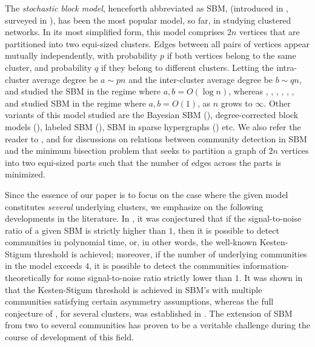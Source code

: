 \documentclass[11pt,reqno]{amsart}
\theoremstyle{definition}
\theoremstyle{remark}
\theoremstyle{conjecture}
\begin{document}
The \emph{stochastic block model}, henceforth abbreviated as SBM, (introduced in \cite{holland}, surveyed in \cite{survey}), has been the most popular model, so far, in studying clustered networks. In its most simplified form, this model comprises $2n$ vertices that are partitioned into two equi-sized clusters. Edges between all pairs of vertices appear mutually independently, with probability $p$ if both vertices belong to the same cluster, and probability $q$ if they belong to different clusters. Letting the intra-cluster average degree be $a \sim p n$ and the inter-cluster average degree be $b \sim q n$, \cite{mcsherry} and \cite{exact} studied the SBM in the regime where $a, b = O(\log n)$, whereas \cite{coja}, \cite{decelle_1}, \cite{decelle_2}, \cite{mossel_1}, \cite{mossel_2}, \cite{mossel_3}, \cite{mossel_4} and \cite{massoulie_ramanujan} studied SBM in the regime where $a, b = O(1)$, as $n$ grows to $\infty$. Other variants of this model studied are the Bayesian SBM (\cite{peixoto}), degree-corrected block models (\cite{yan}), labeled SBM (\cite{labeled_1, labeled_2}), SBM in sparse hypergraphs (\cite{pal_zhu}) etc. We also refer the reader to \cite{dyer_frieze}, \cite{jerrum_sorkin} and \cite{condon} for discussions on relations between community detection in SBM and the minimum bisection problem that seeks to partition a graph of $2n$ vertices into two equi-sized parts such that the number of edges across the parts is minimized. 

Since the essence of our paper is to focus on the case where the given model constitutes \emph{several} underlying clusters, we emphasize on the following developments in the literature. In \cite{decelle_1}, it was conjectured that if the signal-to-noise ratio of a given SBM is strictly higher than $1$, then it is possible to detect communities in polynomial time, or, in other words, the well-known Kesten-Stigum threshold is achieved; moreover, if the number of underlying communities in the model exceeds $4$, it is possible to detect the communities information-theoretically for some signal-to-noise ratio strictly lower than $1$. It was shown in \cite{bordenave} that the Kesten-Stigum threshold is achieved in SBM's with multiple communities satisfying certain asymmetry assumptions, whereas the full conjecture of \cite{decelle_1}, for several clusters, was established in \cite{abbe_sandon}. The extension of SBM from two to several communities has proven to be a veritable challenge during the course of development of this field.
\end{document}
